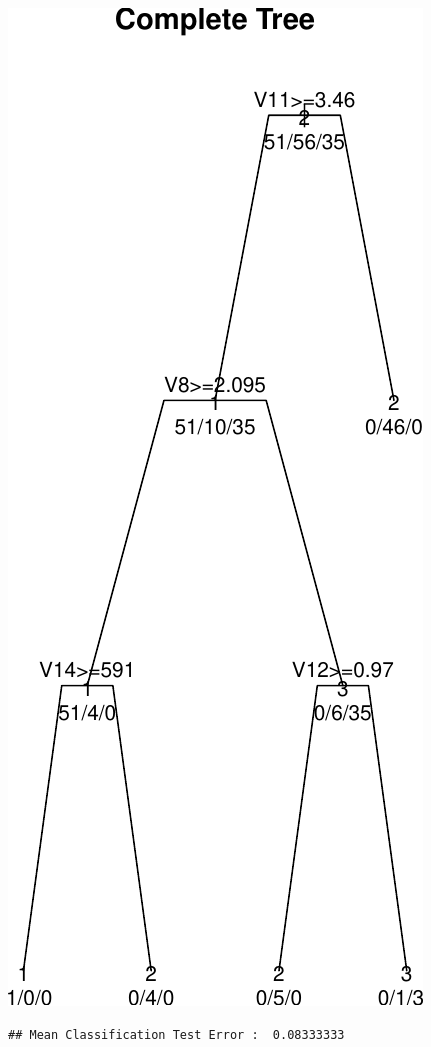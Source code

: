 \documentclass[]{article}
\begin{document}
\begin{center}\includegraphics{HW4_Solution_files/figure-latex/unnamed-chunk-6-1} \end{center}

\begin{verbatim}
## Mean Classification Test Error :  0.08333333
\end{verbatim}
\end{document}
